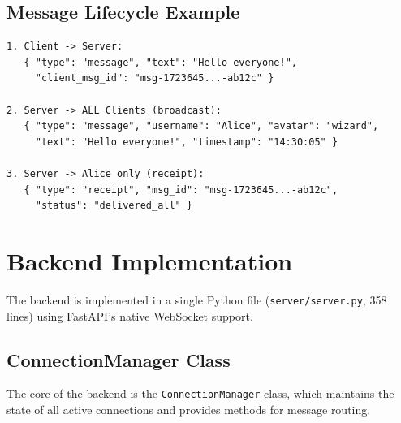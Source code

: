 \documentclass[12pt, a4paper]{article}
\begin{document}
\subsection{Message Lifecycle Example}

\begin{lstlisting}[language={}, caption={Example: User ``Alice'' sending a message}, label={lst:msgflow}]
1. Client -> Server:
   { "type": "message", "text": "Hello everyone!",
     "client_msg_id": "msg-1723645...-ab12c" }

2. Server -> ALL Clients (broadcast):
   { "type": "message", "username": "Alice", "avatar": "wizard",
     "text": "Hello everyone!", "timestamp": "14:30:05" }

3. Server -> Alice only (receipt):
   { "type": "receipt", "msg_id": "msg-1723645...-ab12c",
     "status": "delivered_all" }
\end{lstlisting}


\section{Backend Implementation}

The backend is implemented in a single Python file (\texttt{server/server.py}, 358 lines) using FastAPI's native WebSocket support.

\subsection{ConnectionManager Class}

The core of the backend is the \texttt{ConnectionManager} class, which maintains the state of all active connections and provides methods for message routing.
\end{document}
